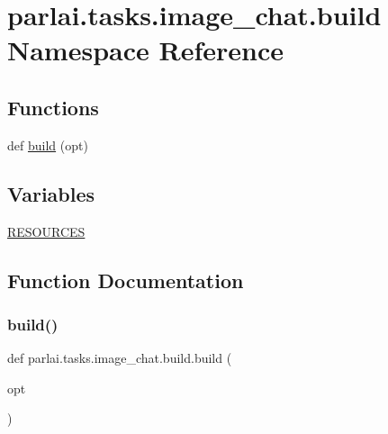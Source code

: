 \hypertarget{namespaceparlai_1_1tasks_1_1image__chat_1_1build}{}\section{parlai.\+tasks.\+image\+\_\+chat.\+build Namespace Reference}
\label{namespaceparlai_1_1tasks_1_1image__chat_1_1build}
\subsection*{Functions}
\begin{DoxyCompactItemize}
\item 
def \hyperlink{namespaceparlai_1_1tasks_1_1image__chat_1_1build_a82355284c67a174d8c8a730a4a819906}{build} (opt)
\end{DoxyCompactItemize}
\subsection*{Variables}
\begin{DoxyCompactItemize}
\item 
\hyperlink{namespaceparlai_1_1tasks_1_1image__chat_1_1build_af499ab24779be231673b33acace2a11f}{R\+E\+S\+O\+U\+R\+C\+ES}
\end{DoxyCompactItemize}


\subsection{Function Documentation}
\mbox{\label{namespaceparlai_1_1tasks_1_1image__chat_1_1build_a82355284c67a174d8c8a730a4a819906}} 
\subsubsection{\texorpdfstring{build()}{build()}}
{\footnotesize\ttfamily def parlai.\+tasks.\+image\+\_\+chat.\+build.\+build (\begin{DoxyParamCaption}\item[{}]{opt }\end{DoxyParamCaption})}



